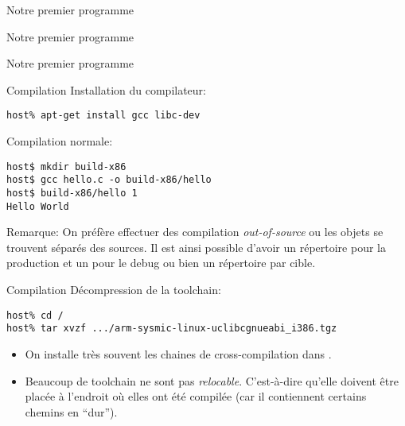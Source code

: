 \begin{frame}[fragile=singleslide]{Notre premier programme}{}
  
\end{frame}

\begin{frame}[fragile=singleslide]{Notre premier programme}{}
  
\end{frame}

\begin{frame}[fragile=singleslide]{Notre premier programme}{}
  
\end{frame}

\begin{frame}[fragile=singleslide]{Compilation}
  Installation du compilateur:
  \begin{lstlisting}
host% apt-get install gcc libc-dev
  \end{lstlisting}
  Compilation normale:
  \begin{lstlisting}
host$ mkdir build-x86
host$ gcc hello.c -o build-x86/hello
host$ build-x86/hello 1
Hello World
\end{lstlisting} %
Remarque: On préfère effectuer des compilation \emph{out-of-source} ou
les objets  se trouvent  séparés des sources.   Il est  ainsi possible
d'avoir un répertoire  pour la production et un pour  le debug ou bien
un répertoire par cible.
\end{frame}

\begin{frame}[fragile=singleslide]{Compilation}
  Décompression de la toolchain:
  \begin{lstlisting} 
host% cd /
host% tar xvzf .../arm-sysmic-linux-uclibcgnueabi_i386.tgz
  \end{lstlisting}
  \begin{itemize} 
  \item   On  installe  très souvent  les  chaines  de cross-compilation  dans
    . 
  \item      Beaucoup      de      toolchain     ne      sont      pas
    \emph{relocable}.  C'est-à-dire  qu'elle  doivent  être  placée  à
    l'endroit où  elles ont été compilée (car  il contiennent certains
    chemins en ``dur'').
  \end{itemize}
\end{frame}

